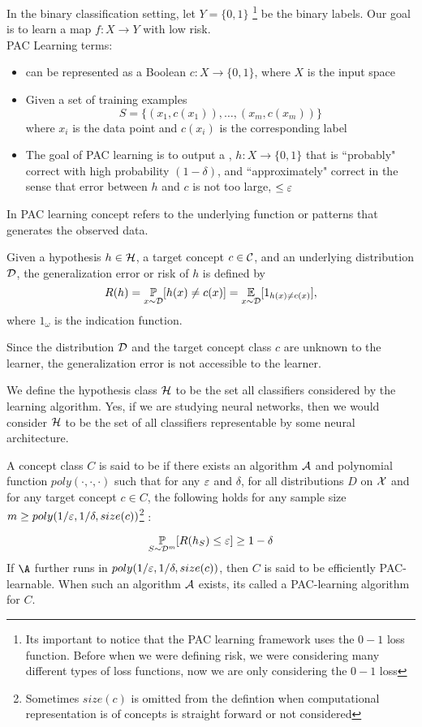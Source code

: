 In the binary classification setting, let 
$Y =\{0,1\}$ \footnote{Its important to notice that the PAC learning framework uses the $0-1$ loss function. Before when we were defining risk, we were considering many different types of loss functions, now we are only considering the $0-1$ loss}
be the binary labels. Our goal is to learn a map $f: X \to Y$ with low risk.
\\
PAC Learning terms:
\begin{itemize}
    \item {} can be represented as a Boolean $c: X \to \{0,1\}$, where $X$ is the input space
    \item Given a set of training examples 
    $$
    S = \{(x_1,c(x_1)), \dots, (x_m,c(x_m))\}
    $$
    where $x_i$ is the data point and $c(x_i)$ is the corresponding label
    \item The goal of PAC learning is to output a , $h: X \to \{0,1\}$ that is ``probably" correct with high probability $(1-\delta)$, and ``approximately" correct in the sense that error between $h$ and $c$ is not too large, $\leq \varepsilon$
\end{itemize}
In PAC learning concept refers to the underlying function or patterns that generates the observed data.


\begin{definition}
    Given a hypothesis $h \in \mathcal H$, a target concept $c \in \mathcal C$, and an underlying distribution $\mathcal D$, the generalization error or risk of $h$ is defined by 
    $$
    R(h) =  \underset{x \sim \mathcal D}{\mathbb P} [h(x) \neq c(x)] = \underset{x \sim \mathcal D}{\mathbb E} [1_{h(x) \neq c(x)}],
    $$
    where $1_{\omega}$ is the indication function.
\end{definition}
Since the distribution $\mathcal D$ and the target concept class $c$ are unknown to the learner, the generalization error is not accessible to the learner.

We define the hypothesis class $\mathcal H$ to be the set all classifiers considered by the learning algorithm. 
Yes, if we are studying neural networks, then we would consider $\mathcal H$ to be the set of all classifiers representable by some neural architecture.  

\begin{definition}
    A concept class $C$ is said to be 
    if there exists an algorithm $\mathcal A$ and polynomial function $poly(\cdot, \cdot, \cdot)$ such that for any $\varepsilon$ and $\delta$, for all distributions $D$ on $\mathcal X$ and for any target concept $c \in C$, the following holds for any sample size $m \geq poly(1/ \varepsilon, 1/ \delta, size(c))$\footnote{Sometimes $size(c)$ is omitted from the defintion when computational representation is of concepts is straight forward or not considered}
    :

    $$
     \underset{S \sim \mathcal D^m}{\mathbb P}[R(h_S) \leq \varepsilon] \geq 1 - \delta
    $$
    If $\A$ further runs in $poly(1/ \varepsilon, 1/ \delta, size(c))$, then $C$ is said to be efficiently PAC-learnable. When such an algorithm $\mathcal A$ exists, its called a PAC-learning algorithm for $C$.  
\end{definition}

